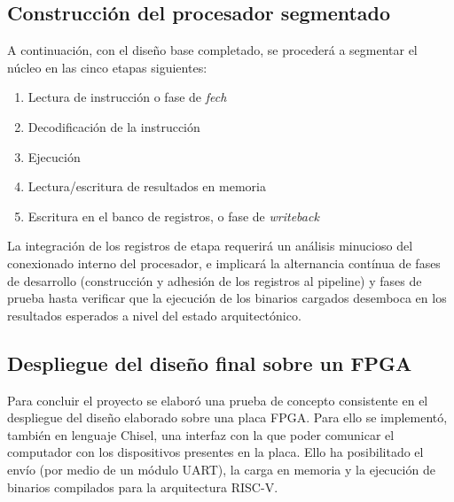 \subsection{Construcción del procesador segmentado}

A continuación, con el diseño base completado, se procederá a segmentar el núcleo en las cinco etapas siguientes:

\begin{enumerate}
  \item{Lectura de instrucción o fase de \textit{fech}}
  \vspace{-0.2cm}
  \item{Decodificación de la instrucción}
  \vspace{-0.2cm}
  \item{Ejecución}
  \vspace{-0.2cm}
  \item{Lectura/escritura de resultados en memoria}
  \vspace{-0.2cm}
  \item{Escritura en el banco de registros, o fase de \textit{writeback}}
\end{enumerate}

La integración de los registros de etapa requerirá un análisis minucioso del conexionado interno del procesador, e implicará la alternancia contínua de fases de desarrollo (construcción y adhesión de los registros al pipeline) y fases de prueba hasta verificar que la ejecución de los binarios cargados desemboca en los resultados esperados a nivel del estado arquitectónico.

\subsection{Despliegue del diseño final sobre un FPGA}

Para concluir el proyecto se elaboró una prueba de concepto consistente en el despliegue del diseño elaborado sobre una placa FPGA. Para ello se implementó, también en lenguaje Chisel, una interfaz con la que poder comunicar el computador con los dispositivos presentes en la placa. Ello ha posibilitado el envío (por medio de un módulo UART), la carga en memoria y la ejecución de binarios compilados para la arquitectura RISC-V.